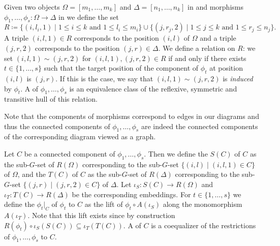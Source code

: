 \begin{defn}\label{defn:connected_components_of_parallel_maps}
Given two objects $\Omega = [m_1,\dots,m_k]$ and $\Delta = [n_1,\dots,n_k]$ in \SkeletalGSets{} and morphisms $\phi_1,\dots,\phi_s\colon \Omega \to \Delta$ in \SkeletalGSets{} we define the set \[R \coloneqq \{ (i,l_i,1) \mid 1 \leq i \leq k\text{ and } 1 \leq l_i \leq m_i \} \cup \{ (j,r_j,2) \mid 1 \leq j \leq k\text{ and } 1 \leq r_j \leq n_j \}.\] A triple $(i,l,1) \in R$ corresponds to the position $(i,l)$ of $\Omega$ and a triple $(j,r,2)$ corresponds to the position $(j,r) \in \Delta$. We define a relation on $R$: we set $(i,l,1) \sim (j,r,2)$ for $(i,l,1),(j,r,2) \in R$ if and only if there exists $t \in \{1,\dots,s\}$ such that the target position of the component of $\phi_t$ at position $(i,l)$ is $(j,r)$. If this is the case, we say that $(i,l,1) \sim (j,r,2)$ is \emph{induced} by $\phi_t$. A  of $\phi_1,\dots,\phi_s$ is an equivalence class of the reflexive, symmetric and transitive hull of this relation.

Note that the components of morphisms correspond to edges in our diagrams and thus the connected components of $\phi_1,\dots,\phi_s$ are indeed the connected components of the corresponding diagram viewed as a graph.

Let $C$ be a connected component of $\phi_1,\dots,\phi_s$. Then we define the  $S(C)$ of $C$ as the sub-$G$-set of $R(\Omega)$ corresponding to the sub-$G$-set $\{(i,l) \mid (i,l,1) \in C\}$ of $\Omega$, and the  $T(C)$ of $C$ as the sub-$G$-set of $R(\Delta)$ corresponding to the sub-$G$-set $\{(j,r) \mid (j,r,2) \in C\}$ of $\Delta$. Let $\iota_S\colon S(C) \to R(\Omega)$ and $\iota_T\colon T(C) \to R(\Delta)$ be the corresponding embeddings. For $t \in \{1,\dots,s\}$ we define the  $\phi_t\vert_C$ of $\phi_t$ to $C$ as the lift of $\phi_t \circ A(\iota_S)$ along the monomorphism $A(\iota_T)$. Note that this lift exists since by construction $R(\phi_t) \circ \iota_S(S(C)) \subseteq \iota_T(T(C))$. A  of $C$ is a coequalizer of the restrictions of $\phi_1,\dots,\phi_s$ to $C$.
\end{defn}

